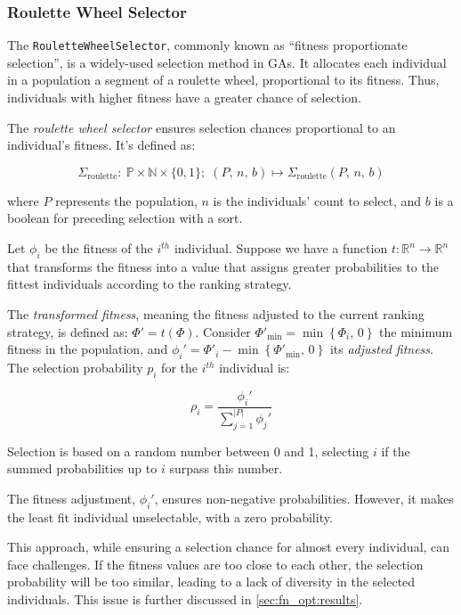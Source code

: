 \subsubsection{Roulette Wheel Selector}
\label{sec:keen:op:select:roulette}
  The \texttt{RouletteWheelSelector}, commonly known as \enquote{fitness 
  proportionate selection}, is a widely-used selection method in GAs.
  It allocates each individual in a population a segment of a roulette wheel, 
  proportional to its fitness.
  Thus, individuals with higher fitness have a greater chance of selection.

  \begin{definition}
    The \emph{roulette wheel selector} ensures selection chances proportional to 
    an individual's fitness.
    It's defined as:

    \begin{equation}
      \Sigma_\mathrm{roulette} :\:
        \mathbb{P} \times \mathbb{N} \times \{0, 1\};\;
      (P,\, n,\, b) \mapsto \Sigma_\mathrm{roulette}(P,\, n,\, b)
    \end{equation}

    where \(P\) represents the population, \(n\) is the individuals' count to 
    select, and \(b\) is a boolean for preceding selection with a sort.

    Let \(\phi_i\) be the fitness of the \(i^{th}\) individual.
    Suppose we have a function \(t : \mathbb{R}^n \to \mathbb{R}^n\) that 
    transforms the fitness into a value that assigns greater probabilities to 
    the fittest individuals according to the ranking strategy.

    The \textit{transformed fitness}, meaning the fitness adjusted to the
    current ranking strategy, is defined as: \(\Phi' = t(\Phi)\).
    Consider \(\Phi'_\mathrm{min} = \min\left\{\Phi_i,\, 0\right\}\) the minimum
    fitness in the population, and \(\phi_i' =  
    \Phi'_i - \min\left\{\Phi'_\mathrm{min},\, 0\right\}\) its \textit{adjusted 
    fitness}.
    The selection probability \(p_i\) for the \(i^{th}\) individual is:

    \begin{equation}
      \rho_i = \frac{\phi_i'}{\sum_{j=1}^{|P|} \phi_j'}
    \end{equation}

    Selection is based on a random number between 0 and 1, selecting \(i\) if 
    the summed probabilities up to \(i\) surpass this number.
  \end{definition}

  \begin{remark}
    The fitness adjustment, \(\phi_i'\), ensures non-negative probabilities. 
    However, it makes the least fit individual unselectable, with a zero 
    probability.
  \end{remark}

  This approach, while ensuring a selection chance for almost every individual, can face challenges. If the fitness 
  values are too close to each other, the selection probability will be too similar, leading to a lack of diversity in 
  the selected individuals. This issue is further discussed in \vref{sec:fn_opt:results}.
